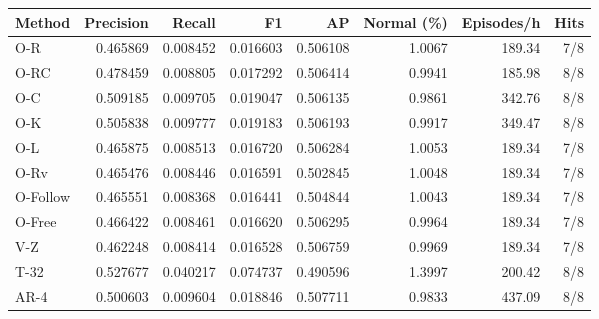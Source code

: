 \begin{tabular}{lrrrrrrr}
\toprule
Method & Precision & Recall & F1 & AP & Normal (\%) & Episodes/h & Hits \\
\midrule
O-R & 0.465869 & 0.008452 & 0.016603 & 0.506108 & 1.0067 & 189.34 & 7/8 \\
O-RC & 0.478459 & 0.008805 & 0.017292 & 0.506414 & 0.9941 & 185.98 & 8/8 \\
O-C & 0.509185 & 0.009705 & 0.019047 & 0.506135 & 0.9861 & 342.76 & 8/8 \\
O-K & 0.505838 & 0.009777 & 0.019183 & 0.506193 & 0.9917 & 349.47 & 8/8 \\
O-L & 0.465875 & 0.008513 & 0.016720 & 0.506284 & 1.0053 & 189.34 & 7/8 \\
O-Rv & 0.465476 & 0.008446 & 0.016591 & 0.502845 & 1.0048 & 189.34 & 7/8 \\
O-Follow & 0.465551 & 0.008368 & 0.016441 & 0.504844 & 1.0043 & 189.34 & 7/8 \\
O-Free & 0.466422 & 0.008461 & 0.016620 & 0.506295 & 0.9964 & 189.34 & 7/8 \\
V-Z & 0.462248 & 0.008414 & 0.016528 & 0.506759 & 0.9969 & 189.34 & 7/8 \\
T-32 & 0.527677 & 0.040217 & 0.074737 & 0.490596 & 1.3997 & 200.42 & 8/8 \\
AR-4 & 0.500603 & 0.009604 & 0.018846 & 0.507711 & 0.9833 & 437.09 & 8/8 \\
\bottomrule
\end{tabular}
